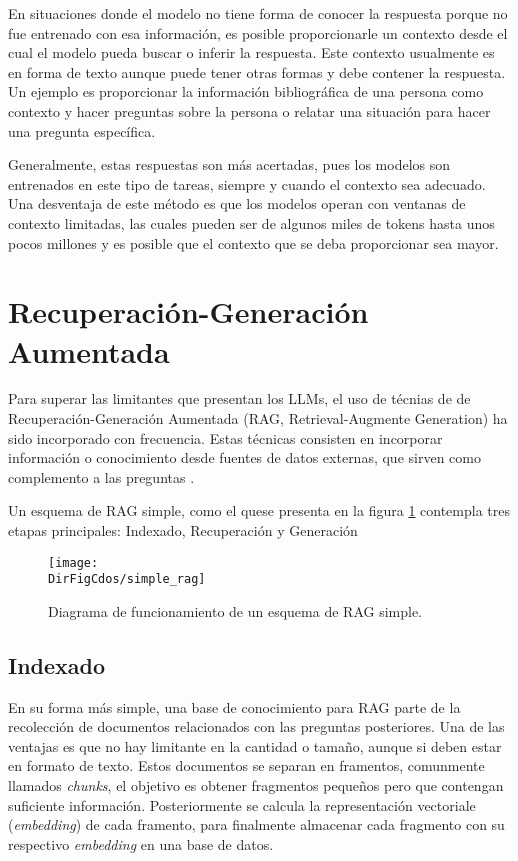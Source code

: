 En situaciones donde el modelo no tiene forma de conocer la respuesta porque
no fue entrenado con esa información, es posible proporcionarle un contexto
desde el cual el modelo pueda buscar o inferir la respuesta. Este contexto
usualmente es en forma de texto aunque puede tener otras formas y debe contener
la respuesta. Un ejemplo es proporcionar la información bibliográfica de una
persona como contexto y hacer preguntas sobre la persona o relatar una
situación para hacer una pregunta específica.

Generalmente, estas respuestas son más acertadas, pues los modelos son entrenados
en este tipo de tareas, siempre y cuando el contexto sea adecuado. Una
desventaja de este método es que los modelos operan con ventanas de contexto
limitadas, las cuales pueden ser de algunos miles de tokens hasta unos pocos
millones y es posible que el contexto que se deba proporcionar sea mayor.

\section{Recuperación-Generación Aumentada}

Para superar las limitantes que presentan los LLMs, el uso de técnias de
de Recuperación-Generación Aumentada (RAG, Retrieval-Augmente Generation) ha
sido incorporado con frecuencia. Estas técnicas consisten en incorporar
información o conocimiento desde fuentes de datos externas, que sirven como
complemento a las preguntas \cite{fan_survey_2024}.

Un esquema de RAG simple, como el quese presenta en la figura \ref{fig:rag}
contempla tres etapas principales: Indexado, Recuperación y Generación

\begin{figure}[]
    \centering
    \texttt{[image: \\DirFigCdos/simple\_rag]}
    \caption{Diagrama de funcionamiento de un esquema de RAG simple.}
    \label{fig:rag}
\end{figure}

\subsection{Indexado}

En su forma más simple, una base de conocimiento para RAG parte de la recolección
de documentos relacionados con las preguntas posteriores. Una de las ventajas
es que no hay limitante en la cantidad o tamaño, aunque si deben estar en
formato de texto. Estos documentos se separan en framentos, comunmente
llamados \textit{chunks}, el objetivo es obtener fragmentos pequeños pero
que contengan suficiente información. Posteriormente se calcula la
representación vectoriale (\textit{embedding}) de cada framento, para finalmente
almacenar cada fragmento con su respectivo \textit{embedding} en una base
de datos.

